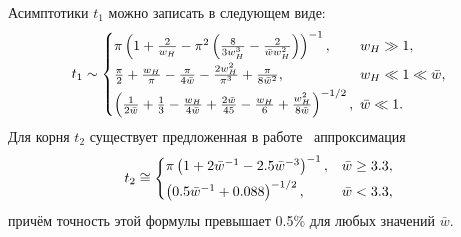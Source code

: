 Асимптотики $t_1$ можно записать в следующем виде:
\begin{equation}
t_1\sim
\begin{cases}
\vspace{0.1cm}
\pi\left(1+\frac{2}{{w}_H}-\pi^2\left(\frac{8}{3{w}_H^3}-\frac{2}{\bar{w}{w}_H^2}\right)
\right)^{-1},\! &\!\! {w}_H\gg 1,\\
\vspace{0.1cm}
\frac{\pi}{2}+\frac{{w}_H}{\pi} -\frac{\pi}{4\bar{w}}-\frac{2{w}_H^2}{\pi^3}+\frac{\pi}{8\bar{w}^2}
,\! &\!\! {w}_H\ll 1\ll\bar{w},\\
\left(\frac{1}{2\bar{w}}+\frac13-\frac{{w}_H}{4\bar{w}}+\frac{2\bar{w}}{45}
-\frac{{w}_H}{6}+\frac{{w}_H^2}{8\bar{w}}
\right)^{-1/2},\! &\!\!  \bar{w}\ll 1.
\end{cases}
\end{equation}
Для корня $t_2$ существует предложенная в работе~\autocite{VAR2013} аппроксимация
\begin{equation}
t_2\cong
\begin{cases}
\vspace{0.1cm}
\pi\left(1+2\bar{w}^{-1}-2.5\bar{w}^{-3}\right)^{-1}, & \bar{w}\geq 3.3, \\
\left(0.5\bar{w}^{-1}+0.088 \right)^{-1/2}, &\bar{w} < 3.3,
\end{cases}
\end{equation}
причём точность этой формулы превышает 0.5\% для любых значений $\bar{w}$.

